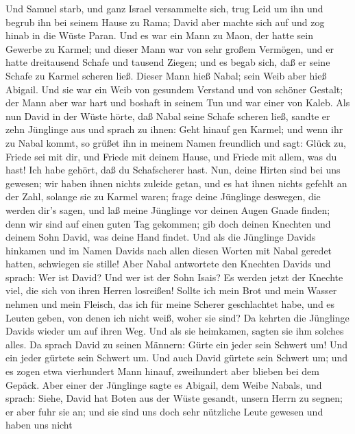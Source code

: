  Und Samuel starb, und ganz Israel versammelte sich, trug
Leid um ihn und begrub ihn bei seinem Hause zu Rama; David aber machte
sich auf und zog hinab in die Wüste Paran.  Und es war ein
Mann zu Maon, der hatte sein Gewerbe zu Karmel; und dieser Mann war von
sehr großem Vermögen, und er hatte dreitausend Schafe und tausend
Ziegen; und es begab sich, daß er seine Schafe zu Karmel scheren ließ.
 Dieser Mann hieß Nabal; sein Weib aber hieß Abigail. Und
sie war ein Weib von gesundem Verstand und von schöner Gestalt; der Mann
aber war hart und boshaft in seinem Tun und war einer von Kaleb.
 Als nun David in der Wüste hörte, daß Nabal seine Schafe
scheren ließ,  sandte er zehn Jünglinge aus und sprach zu
ihnen: Geht hinauf gen Karmel; und wenn ihr zu Nabal kommt, so grüßet
ihn in meinem Namen freundlich  und sagt: Glück zu, Friede
sei mit dir, und Friede mit deinem Hause, und Friede mit allem, was du
hast!  Ich habe gehört, daß du Schafscherer hast. Nun,
deine Hirten sind bei uns gewesen; wir haben ihnen nichts zuleide getan,
und es hat ihnen nichts gefehlt an der Zahl, solange sie zu Karmel
waren;  frage deine Jünglinge deswegen, die werden dir's
sagen, und laß meine Jünglinge vor deinen Augen Gnade finden; denn wir
sind auf einen guten Tag gekommen; gib doch deinen Knechten und deinem
Sohn David, was deine Hand findet.  Und als die Jünglinge
Davids hinkamen und im Namen Davids nach allen diesen Worten mit Nabal
geredet hatten, schwiegen sie stille!  Aber Nabal
antwortete den Knechten Davids und sprach: Wer ist David? Und wer ist
der Sohn Isais? Es werden jetzt der Knechte viel, die sich von ihren
Herren losreißen!  Sollte ich mein Brot und mein Wasser
nehmen und mein Fleisch, das ich für meine Scherer geschlachtet habe,
und es Leuten geben, von denen ich nicht weiß, woher sie sind?
 Da kehrten die Jünglinge Davids wieder um auf ihren Weg.
Und als sie heimkamen, sagten sie ihm solches alles.  Da
sprach David zu seinen Männern: Gürte ein jeder sein Schwert um! Und ein
jeder gürtete sein Schwert um. Und auch David gürtete sein Schwert um;
und es zogen etwa vierhundert Mann hinauf, zweihundert aber blieben bei
dem Gepäck.  Aber einer der Jünglinge sagte es Abigail,
dem Weibe Nabals, und sprach: Siehe, David hat Boten aus der Wüste
gesandt, unsern Herrn zu segnen; er aber fuhr sie an; 
und sie sind uns doch sehr nützliche Leute gewesen und haben uns nicht
